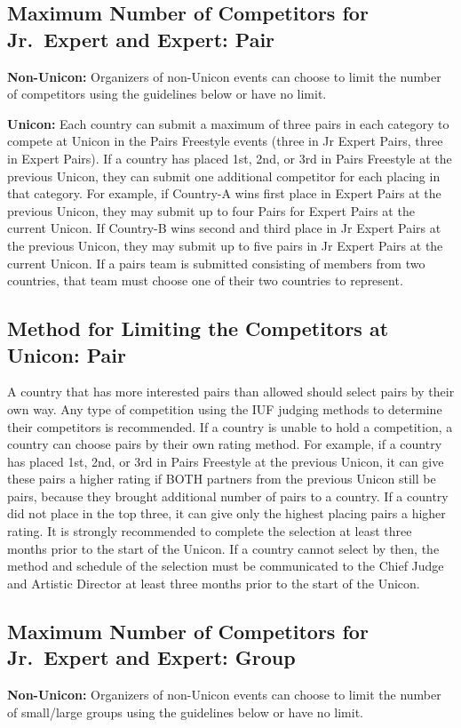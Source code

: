 \subsection{Maximum Number of Competitors for Jr.~Expert and Expert: Pair}
\textbf{Non-Unicon:} Organizers of non-Unicon events can choose to limit the number of competitors using the guidelines below or have no limit.

\textbf{Unicon:} Each country can submit a maximum of three pairs in each category to compete at Unicon in the Pairs Freestyle events (three in Jr Expert Pairs, three in Expert Pairs).
If a country has placed 1st, 2nd, or 3rd in Pairs Freestyle at the previous Unicon, they can submit one additional competitor for each placing in that category.
For example, if Country-A wins first place in Expert Pairs at the previous Unicon, they may submit up to four Pairs for Expert Pairs at the current Unicon.
If Country-B wins second and third place in Jr Expert Pairs at the previous Unicon, they may submit up to five pairs in Jr Expert Pairs at the current Unicon.
If a pairs team is submitted consisting of members from two countries, that team must choose one of their two countries to represent.

\subsection{Method for Limiting the Competitors at Unicon: Pair}
A country that has more interested pairs than allowed should select pairs by their own way.
Any type of competition using the IUF judging methods to determine their competitors is recommended.
If a country is unable to hold a competition, a country can choose pairs by their own rating method.
For example, if a country has placed 1st, 2nd, or 3rd in Pairs Freestyle at the previous Unicon, it can give these pairs a higher rating if BOTH partners from the previous Unicon still be pairs, because they brought additional number of pairs to a country.
If a country did not place in the top three, it can give only the highest placing pairs a higher rating.
It is strongly recommended to complete the selection at least three months prior to the start of the Unicon.
If a country cannot select by then, the method and schedule of the selection must be communicated to the Chief Judge and Artistic Director at least three months prior to the start of the Unicon.

\subsection{Maximum Number of Competitors for Jr.~Expert and Expert: Group}
\textbf{Non-Unicon:} Organizers of non-Unicon events can choose to limit the number of small/large groups using the guidelines below or have no limit.

